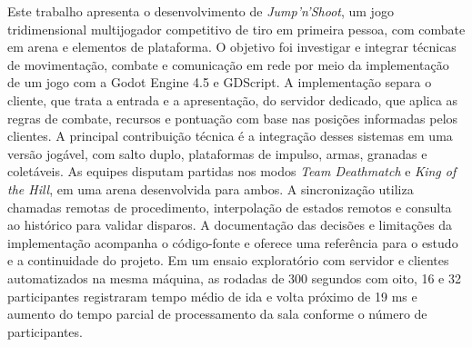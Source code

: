 \begin{resumoutfpr}
Este trabalho apresenta o desenvolvimento de \textit{Jump'n'Shoot}, um jogo tridimensional multijogador competitivo de tiro em primeira pessoa, com combate em arena e elementos de plataforma. O objetivo foi investigar e integrar técnicas de movimentação, combate e comunicação em rede por meio da implementação de um jogo com a Godot Engine 4.5 e GDScript. A implementação separa o cliente, que trata a entrada e a apresentação, do servidor dedicado, que aplica as regras de combate, recursos e pontuação com base nas posições informadas pelos clientes. A principal contribuição técnica é a integração desses sistemas em uma versão jogável, com salto duplo, plataformas de impulso, armas, granadas e coletáveis. As equipes disputam partidas nos modos \textit{Team Deathmatch} e \textit{King of the Hill}, em uma arena desenvolvida para ambos. A sincronização utiliza chamadas remotas de procedimento, interpolação de estados remotos e consulta ao histórico para validar disparos. A documentação das decisões e limitações da implementação acompanha o código-fonte e oferece uma referência para o estudo e a continuidade do projeto. Em um ensaio exploratório com servidor e clientes automatizados na mesma máquina, as rodadas de 300 segundos com oito, 16 e 32 participantes registraram tempo médio de ida e volta próximo de 19 ms e aumento do tempo parcial de processamento da sala conforme o número de participantes.
\end{resumoutfpr}
